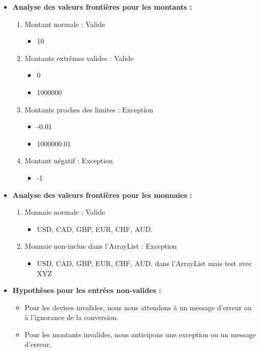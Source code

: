 \documentclass[letterpaper, 10pt]{article}
\begin{document}
\begin{itemize} 
    \item \textbf{Analyse des valeurs frontières pour les montants :}
    \begin{enumerate}
        \item Montant normale : Valide
        \begin{itemize}
            \item 10
        \end{itemize}
        \item Montants extrêmes valides : Valide
        \begin{itemize}
            \item 0
            \item 1000000
        \end{itemize}
         \item Montants proches des limites : Exception
         \begin{itemize}
            \item -0.01
            \item 1000000.01
        \end{itemize}
        \item Montant négatif : Exception
        \begin{itemize}
            \item -1
        \end{itemize}
     \end{enumerate}
     \item \textbf{Analyse des valeurs frontières pour les monnaies :}
    \begin{enumerate}
        \item Monnaie normale : Valide
        \begin{itemize}
            \item USD, CAD, GBP, EUR, CHF, AUD.
        \end{itemize}
        \item Monnaie non-inclue dans l'ArrayList : Exception
        \begin{itemize}
            \item USD, CAD, GBP, EUR, CHF, AUD. dans l'ArrayList mais test avec XYZ
        \end{itemize}
     \end{enumerate}
    \item \textbf{Hypothèses pour les entrées non-valides :}
        \begin{itemize}
            \item Pour les devises invalides, nous nous attendons à un message d'erreur ou à l'ignorance de la conversion.
            \item Pour les montants invalides, nous anticipons une exception ou un message d'erreur.\\
        \end{itemize}


\end{itemize}
\end{document}

